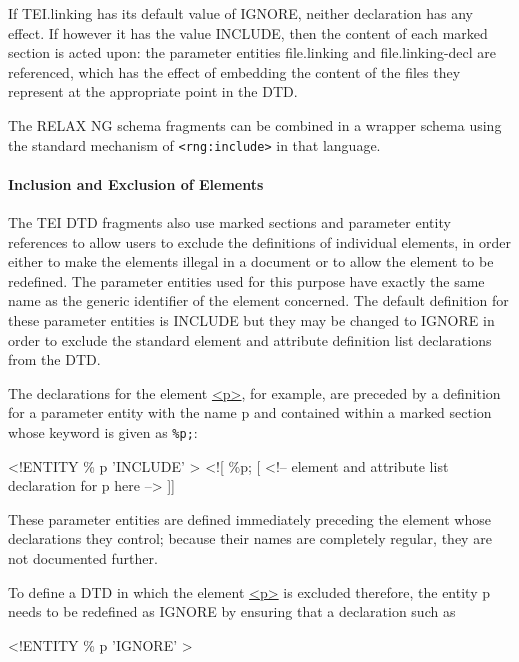 \par\egroup 
 If TEI.linking has its default value of IGNORE, neither declaration has any effect. If however it has the value INCLUDE, then the content of each marked section is acted upon: the parameter entities \textsf{file.linking} and \textsf{file.linking-decl} are referenced, which has the effect of embedding the content of the files they represent at the appropriate point in the DTD.\par
The RELAX NG schema fragments can be combined in a wrapper schema using the standard mechanism of \texttt{<rng:include>} in that language.
\paragraph[{Inclusion and Exclusion of Elements}]{Inclusion and Exclusion of Elements}\label{STPEEX}\par
The TEI DTD fragments also use marked sections and parameter entity references to allow users to exclude the definitions of individual elements, in order either to make the elements illegal in a document or to allow the element to be redefined. The parameter entities used for this purpose have exactly the same name as the generic identifier of the element concerned. The default definition for these parameter entities is INCLUDE but they may be changed to IGNORE in order to exclude the standard element and attribute definition list declarations from the DTD.\par
The declarations for the element \hyperref[TEI.p]{<p>}, for example, are preceded by a definition for a parameter entity with the name \textsf{p} and contained within a marked section whose keyword is given as \texttt{\%p;}: \par\hfill\bgroup\exampleFont\vskip 10pt\begin{shaded}
\obeyspaces <!ENTITY \% p 'INCLUDE' >\newline
<![ \%p; [\newline
       <!-- element and attribute list declaration for p here -->\newline
]]\end{shaded}
\par\egroup 
\par
These parameter entities are defined immediately preceding the element whose declarations they control; because their names are completely regular, they are not documented further. \par
To define a DTD in which the element \hyperref[TEI.p]{<p>} is excluded therefore, the entity \textsf{p} needs to be redefined as IGNORE by ensuring that a declaration such as \par\hfill\bgroup\exampleFont\vskip 10pt\begin{shaded}
\obeyspaces <!ENTITY \% p 'IGNORE' >\end{shaded}

